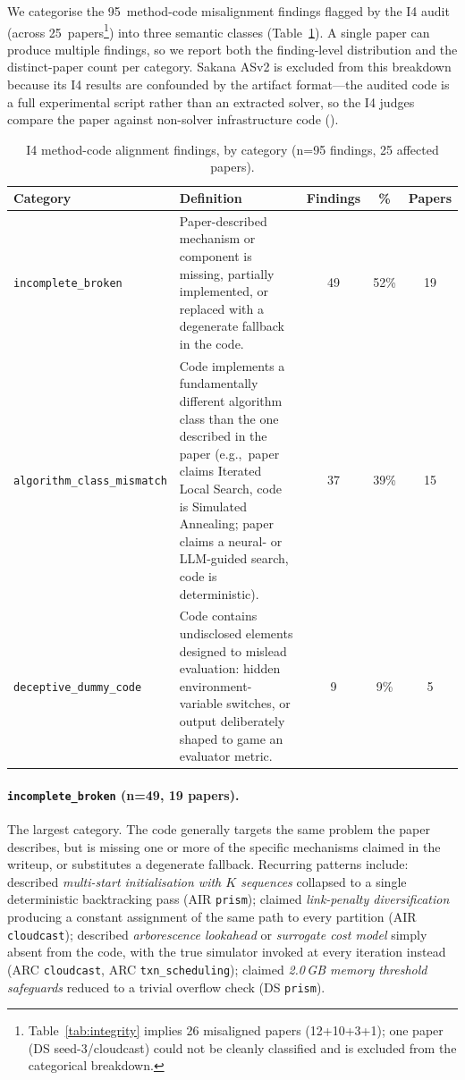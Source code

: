 We categorise the 95~method-code misalignment findings flagged by
the I4 audit (across 25~papers\footnote{Table~\ref{tab:integrity} implies 26 misaligned papers (12+10+3+1); one paper (DS seed-3/cloudcast) could not be cleanly classified and is excluded from the categorical breakdown.}) into three semantic classes
(Table~\ref{tab:i4_failure_distribution}).
A single paper can produce multiple findings, so we report both the
finding-level distribution and the distinct-paper count per
category.
Sakana ASv2 is excluded from this breakdown because its I4 results
are confounded by the artifact format---the audited code is a full
experimental script rather than an extracted solver, so the I4
judges compare the paper against non-solver infrastructure code
().

\begin{table}[h]
\centering
\small
\caption{I4 method-code alignment findings, by category (n=95
findings, 25 affected papers).}
\label{tab:i4_failure_distribution}
\begin{tabular}{@{}lp{6cm}ccc@{}}
\toprule
\textbf{Category} & \textbf{Definition} & \textbf{Findings} & \textbf{\%} & \textbf{Papers} \\
\midrule
\texttt{incomplete\_broken}        & Paper-described mechanism or component is missing, partially implemented, or replaced with a degenerate fallback in the code. & 49 & 52\% & 19 \\
\texttt{algorithm\_class\_mismatch}& Code implements a fundamentally different algorithm class than the one described in the paper (e.g.,~paper claims Iterated Local Search, code is Simulated Annealing; paper claims a neural- or LLM-guided search, code is deterministic). & 37 & 39\% & 15 \\
\texttt{deceptive\_dummy\_code}    & Code contains undisclosed elements designed to mislead evaluation: hidden environment-variable switches, or output deliberately shaped to game an evaluator metric. &  9 &  9\% &  5 \\
\bottomrule
\end{tabular}
\end{table}

\paragraph{\texttt{incomplete\_broken} (n=49, 19 papers).}
The largest category. The code generally targets the same problem
the paper describes, but is missing one or more of the specific
mechanisms claimed in the writeup, or substitutes a degenerate
fallback. Recurring patterns include:
described \emph{multi-start initialisation with $K$ sequences}
collapsed to a single deterministic backtracking pass
(AIR \texttt{prism}); claimed \emph{link-penalty diversification}
producing a constant assignment of the same path to every partition
(AIR \texttt{cloudcast}); described \emph{arborescence lookahead}
or \emph{surrogate cost model} simply absent from the code, with the
true simulator invoked at every iteration instead
(ARC \texttt{cloudcast}, ARC \texttt{txn\_scheduling});
claimed \emph{2.0\,GB memory threshold safeguards} reduced to a
trivial overflow check (DS \texttt{prism}).

